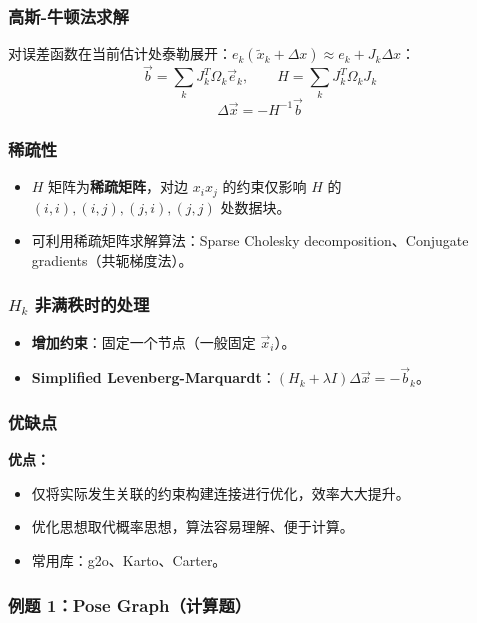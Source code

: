 \documentclass[11pt,a4paper]{article}
\begin{document}
\subsubsection*{高斯-牛顿法求解}
对误差函数在当前估计处泰勒展开：$e_k(\tilde{x}_k+\Delta x)\approx e_k+J_k\Delta x$：
\[
\vec{b}=\sum_k J_k^T\Omega_k\vec{e}_k,\qquad
H=\sum_k J_k^T\Omega_k J_k
\]
\[
\boxed{\;\Delta\vec{x}=-H^{-1}\vec{b}\;}
\]

\subsubsection*{稀疏性}
\begin{itemize}
  \item $H$ 矩阵为\textbf{稀疏矩阵}，对边 $x_ix_j$ 的约束仅影响 $H$ 的 $(i,i),(i,j),(j,i),(j,j)$ 处数据块。
  \item 可利用稀疏矩阵求解算法：Sparse Cholesky decomposition、Conjugate gradients（共轭梯度法）。
\end{itemize}

\subsubsection*{$H_k$ 非满秩时的处理}
\begin{itemize}
  \item \textbf{增加约束}：固定一个节点（一般固定 $\vec{x}_i$）。
  \item \textbf{Simplified Levenberg-Marquardt}：$(H_k+\lambda I)\Delta\vec{x}=-\vec{b}_k$。
\end{itemize}

\subsubsection*{优缺点}
\begin{notebox}
\textbf{优点：}
\begin{itemize}
  \item 仅将实际发生关联的约束构建连接进行优化，效率大大提升。
  \item 优化思想取代概率思想，算法容易理解、便于计算。
  \item 常用库：g2o、Karto、Carter。
\end{itemize}
\end{notebox}

\subsubsection*{例题 1：Pose Graph（计算题）}
\end{document}
